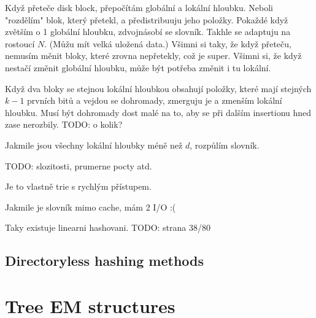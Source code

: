 \documentclass[a4paper]{article}
\begin{document}
Když přeteče disk block, přepočítám globální a lokální hloubku.
Neboli "rozdělím" blok, který přetekl, a předistribuuju jeho položky.
Pokaždé když zvětším o 1 globální hloubku, zdvojnásobí se slovník. Takhle se
adaptuju na rostoucí $N$. (Můžu mít velká uložená data.)
Všimni si taky, že když přeteču, nemusím měnit bloky, které zrovna nepřetekly,
což je super.
Všimni si, že když nestačí změnit globální hloubku, může být potřeba změnit i tu
lokální.

Když dva bloky se stejnou lokální hloubkou obsahují položky, které mají stejných
$k-1$ prvních bitů a vejdou se dohromady, zmerguju je a zmenším lokální hloubku.
Musí být dohromady dost malé na to, aby se při dalším insertionu hned zase
nerozbily. TODO: o kolik?

Jakmile jsou všechny lokální hloubky méně než $d$, rozpůlím slovník.

TODO: slozitosti, prumerne pocty atd.

Je to vlastně trie s rychlým přístupem.

Jakmile je slovník mimo cache, mám 2 I/O :(

Taky existuje linearni hashovani. TODO: strana 38/80

\subsection{Directoryless hashing methods}

\section{Tree EM structures}



\end{document}
